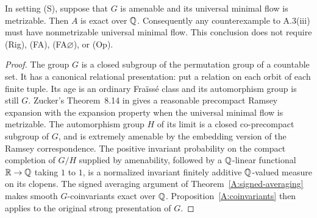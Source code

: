 \begin{corollary}
\label{A:metrizable-umf-exact}
In setting (S), suppose that $G$ is amenable and its universal minimal
flow is metrizable. Then $A$ is exact over $\mathbb Q$. Consequently any
counterexample to A.3(iii) must have nonmetrizable universal minimal
flow. This conclusion does not require (Rig), (FA), (FA$\varnothing$),
or (Op).
\end{corollary}
\begin{proof}
The group $G$ is a closed subgroup of the permutation group of a
countable set. It has a canonical relational presentation: put a
relation on each orbit of each finite tuple. Its age is an ordinary
Fra\"iss\'e class and its automorphism group is still $G$.
Zucker's Theorem~8.14 in \cite{ABZucker2016} gives a reasonable
precompact Ramsey expansion with the expansion property when the
universal minimal flow is metrizable. The automorphism group $H$ of
its limit is a closed co-precompact subgroup of $G$, and is extremely
amenable by the embedding version of the Ramsey correspondence.
The positive invariant probability on the compact completion of
$G/H$ supplied by amenability, followed by a $\mathbb Q$-linear functional
$\mathbb R\to\mathbb Q$ taking $1$ to $1$, is a normalized invariant finitely
additive $\mathbb Q$-valued measure on its clopens. The signed averaging
argument of Theorem~\ref{A:signed-averaging} makes smooth
$G$-coinvariants exact over $\mathbb Q$. Proposition~\ref{A:coinvariants}
then applies to the original strong presentation of $G$.
\end{proof}


